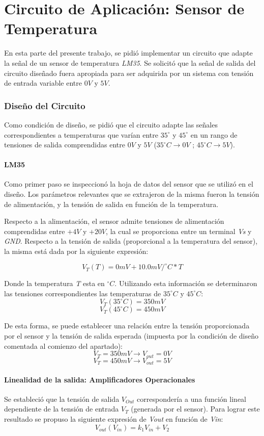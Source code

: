 \part{Circuito de Aplicación: Sensor de Temperatura}
En esta parte del presente trabajo, se pidió implementar un circuito que adapte la señal de un sensor de temperatura \emph{LM35}. Se solicitó que la señal de salida del circuito diseñado fuera apropiada para ser adquirida por un sistema con tensión de entrada variable entre $0V$ y $5V$.

\section{Diseño del Circuito}
Como condición de diseño, se pidió que el circuito adapte las señales correspondientes a temperaturas que varían entre $35^\circ$ y $45^\circ$ en un rango de tensiones de salida comprendidas entre $0V$ y $5V$ ($35^\circ C \rightarrow 0V$ ; $45^\circ C \rightarrow 5V$).

\subsection{LM35}
Como primer paso se inspeccionó la hoja de datos del sensor que se utilizó en el diseño. Los parámetros relevantes que se extrajeron de la misma fueron la tensión de alimentación, y la tensión de salida en función de la temperatura. 

Respecto a la alimentación, el sensor admite tensiones de alimentación comprendidas entre $+4V$ y $+20V$, la cual se proporciona entre un terminal \emph{Vs} y \emph{GND}. Respecto a la tensión de salida (proporcional a la temperatura del sensor), la misma está dada por la siguiente expresión:

\[V_{T}(T) = 0mV + 10.0mV / ^\circ C * T\]

Donde la temperatura \emph{T} esta en $^\circ C$. Utilizando esta información se determinaron las tensiones correspondientes las temperaturas de $35^\circ C$ y $45^\circ C$:
\[V_T(35^\circ C) = 350mV\]
\[V_T(45^\circ C) = 450mV\]

De esta forma, se puede establecer una relación entre la tensión proporcionada por el sensor y la tensión de salida esperada (impuesta por la condición de diseño comentada al comienzo del apartado):
\[V_T = 350mV \rightarrow V_{out} = 0V\]
\[V_T = 450mV \rightarrow V_{out} = 5V\]

\subsection{Linealidad de la salida: Amplificadores Operacionales}
Se estableció que la tensión de salida $V_{Out}$ correspondería a una función lineal dependiente de la tensión de entrada $V_T$ (generada por el sensor). Para lograr este resultado se propuso la siguiente expresión de \emph{Vout} en función de \emph{Vin}:
\[V_{out}(V_{in}) = k_1 V_{in} + V_2\]

